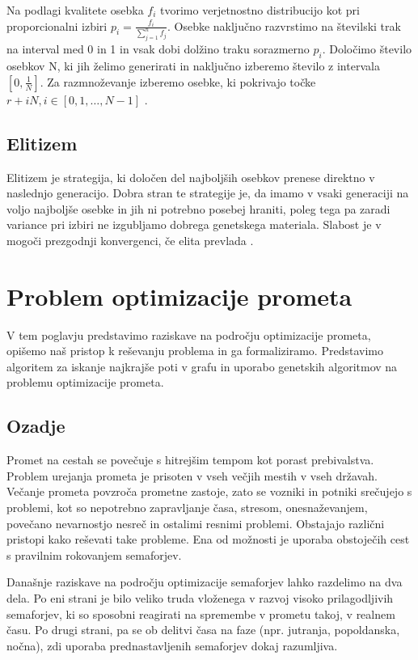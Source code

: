\documentclass[a4paper, 12pt]{book}
\begin{document}
Na podlagi kvalitete osebka $f_i$ tvorimo verjetnostno distribucijo kot pri proporcionalni izbiri
$p_i = \frac{f_i}{\sum_{j=1}^n f_j}$. Osebke naklju\v cno razvrstimo na \v stevilski trak na interval med 0 in 1 in vsak dobi dol\v zino traku sorazmerno $p_i$. Dolo\v cimo \v stevilo osebkov N, ki jih \v zelimo generirati in naklju\v cno izberemo \v stevilo z intervala $[0, \frac{1}{N}]$. Za razmno\v zevanje izberemo osebke, ki pokrivajo to\v cke $r + iN, i \in [0, 1, \dots, N -1]$ \cite{inteligentni sistemi}.

\section{Elitizem}
Elitizem je strategija, ki dolo\v cen del najbolj\v sih osebkov prenese direktno v naslednjo generacijo. Dobra stran te strategije je, da imamo v vsaki generaciji na voljo najbolj\v se osebke in jih ni potrebno posebej hraniti, poleg tega pa zaradi variance pri izbiri ne izgubljamo dobrega genetskega materiala. Slabost je v mogo\v ci prezgodnji konvergenci, \v ce elita prevlada
\cite{inteligentni sistemi}.

\chapter{Problem optimizacije prometa}
\label{ch2}
V tem poglavju predstavimo raziskave na podro\v cju optimizacije prometa, opi\v semo na\v s pristop k re\v sevanju problema in ga formaliziramo. Predstavimo algoritem za iskanje najkraj\v se poti v grafu in uporabo genetskih algoritmov na problemu optimizacije prometa.

\section{Ozadje}
Promet na cestah se pove\v cuje s hitrej\v sim tempom kot porast prebivalstva. Problem urejanja prometa je prisoten v vseh ve\v cjih mestih v vseh dr\v zavah. Ve\v canje prometa povzro\v ca prometne zastoje, zato se vozniki in potniki sre\v cujejo s problemi, kot so nepotrebno zapravljanje \v casa, stresom, onesna\v zevanjem, pove\v cano nevarnostjo nesre\v c in ostalimi resnimi problemi. Obstajajo razli\v cni pristopi kako re\v sevati take probleme. Ena od mo\v znosti je uporaba obstoje\v cih cest s pravilnim rokovanjem semaforjev. 

Dana\v snje raziskave na podro\v cju optimizacije semaforjev lahko razdelimo na dva dela. Po eni strani je bilo veliko truda vlo\v zenega v razvoj visoko prilagodljivih semaforjev, ki so sposobni reagirati na spremembe v prometu takoj, v realnem \v casu. Po drugi strani, pa se ob delitvi \v casa na  faze (npr. jutranja, popoldanska, no\v cna), zdi uporaba prednastavljenih semaforjev dokaj razumljiva.
\end{document}
